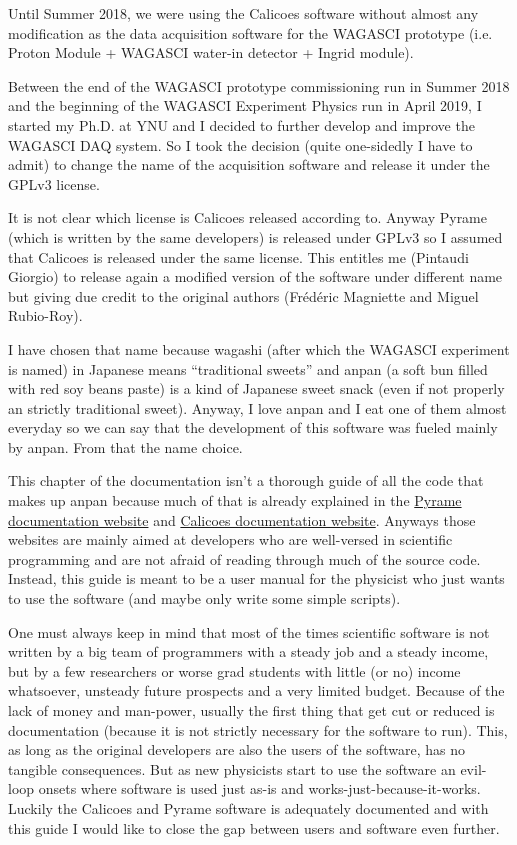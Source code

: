 Until Summer 2018, we were using the Calicoes software without almost
any modification as the data acquisition software for the WAGASCI
prototype (i.e. Proton Module + WAGASCI water-in detector + Ingrid
module).

Between the end of the WAGASCI prototype commissioning run in Summer
2018 and the beginning of the WAGASCI Experiment Physics run in April
2019, I started my Ph.D. at YNU and I decided to further develop and
improve the WAGASCI DAQ system. So I took the decision (quite
one-sidedly I have to admit) to change the name of the acquisition
software and release it under the GPLv3 license.

It is not clear which license is Calicoes released according
to. Anyway Pyrame (which is written by the same developers) is
released under GPLv3 so I assumed that Calicoes is released under the
same license. This entitles me (Pintaudi Giorgio) to release again a
modified version of the software under different name but giving due
credit to the original authors (Frédéric Magniette and Miguel
Rubio-Roy).

I have chosen that name because wagashi (after which the WAGASCI
experiment is named) in Japanese means ``traditional sweets'' and
anpan (a soft bun filled with red soy beans paste) is a kind of
Japanese sweet snack (even if not properly an strictly traditional
sweet). Anyway, I love anpan and I eat one of them almost everyday so
we can say that the development of this software was fueled mainly by
anpan. From that the name choice.

This chapter of the documentation isn't a thorough guide of all the
code that makes up anpan because much of that is already explained in
the \href{http://llr.in2p3.fr/sites/pyrame/documentation/}{Pyrame
  documentation website} and
\href{http://llr.in2p3.fr/sites/pyrame/calicoes/documentation/}{Calicoes
  documentation website}. Anyways those websites are mainly aimed at
developers who are well-versed in scientific programming and are not
afraid of reading through much of the source code. Instead, this guide
is meant to be a user manual for the physicist who just wants to use
the software (and maybe only write some simple scripts).

One must always keep in mind that most of the times scientific
software is not written by a big team of programmers with a steady job
and a steady income, but by a few researchers or worse grad students
with little (or no) income whatsoever, unsteady future prospects and a
very limited budget. Because of the lack of money and man-power,
usually the first thing that get cut or reduced is documentation
(because it is not strictly necessary for the software to run). This,
as long as the original developers are also the users of the software,
has no tangible consequences. But as new physicists start to use the
software an evil-loop onsets where software is used just as-is and
works-just-because-it-works. Luckily the Calicoes and Pyrame software
is adequately documented and with this guide I would like to close the
gap between users and software even further.

